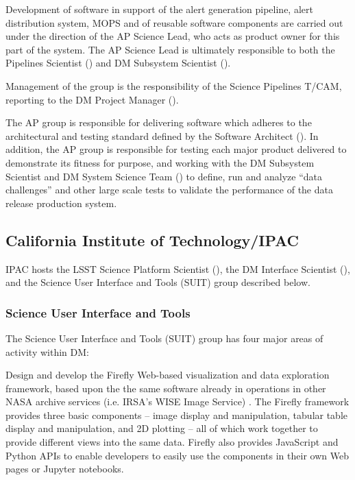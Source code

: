 Development of software in support of the alert generation pipeline, alert distribution system, MOPS and of reusable software components are carried out under the direction of the AP Science Lead, who acts as product owner for this part of the system.
The AP Science Lead is ultimately responsible to both the Pipelines Scientist () and DM Subsystem Scientist ().

Management of the group is the responsibility of the Science Pipelines T/CAM, reporting to the DM Project Manager ().

The AP group is responsible for delivering software which adheres to the architectural and testing standard defined by the Software Architect ().
In addition, the AP group is responsible for testing each major product delivered to demonstrate its fitness for purpose, and working with the DM Subsystem Scientist and DM System Science Team () to define, run and analyze ``data challenges'' and other large scale tests to validate the performance of the data release production system.

\subsection {California Institute of Technology/IPAC\label{sect:ipac}}
IPAC hosts the LSST Science Platform Scientist (), the DM Interface Scientist (), and the Science User Interface and Tools (SUIT) group described below.

\subsubsection{ Science User Interface and Tools}

The Science User Interface and Tools (SUIT) group has four major areas of activity within DM:

Design and develop the Firefly Web-based visualization and data exploration framework, based upon the the same software already in operations in other NASA archive services (i.e. IRSA’s WISE Image Service) . The Firefly framework provides three basic components –  image display and manipulation, tabular table display and manipulation, and 2D plotting – all of which work together to provide different views into the same data. Firefly also provides JavaScript and Python APIs to enable developers to easily use the components in their own Web pages or Jupyter notebooks.

